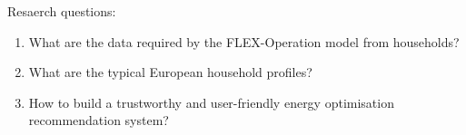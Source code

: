 Resaerch questions:

\begin{enumerate}
  \item What are the data required by the FLEX-Operation model from households? 
  \item What are the typical European household profiles? 
  \item How to build a trustworthy and user-friendly energy optimisation recommendation system? 
\end{enumerate}

